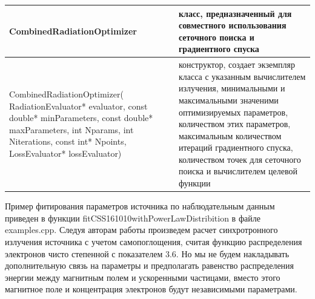 \begin{small}
\begin{xtabular}{|p{0.41\textwidth}|p{0.59\textwidth}|}
		\hline
		\textbf{CombinedRadiationOptimizer} & класс, предназначенный для совместного использования сеточного поиска и градиентного спуска\\
		\hline
		CombinedRadiationOptimizer( RadiationEvaluator* evaluator, const double* minParameters, const double* maxParameters, int Nparams, int Niterations, const int* Npoints, LossEvaluator* lossEvaluator) & конструктор, создает экземпляр класса с указанным вычислителем излучения, минимальными и максимальными значеними оптимизируемых параметров, количеством этих параметров,  максимальным количеством итераций градиентного спуска, количеством точек для сеточного поиска и вычислителем целевой функции\\
		\hline
	\end{xtabular}
\end{small}

Пример фитирования параметров источника по наблюдательным данным приведен в функции fitCSS161010withPowerLawDistribition в файле examples.cpp. Следуя авторам работы \cite{Coppejans2020} произведем расчет синхротронного излучения источника с учетом самопоглощения, считая функцию распределения электронов чисто степенной с показателем 3.6. Но мы не будем накладывать дополнительную связь на параметры и предполагать равенство распределения энергии между магнитным полем и ускоренными частицами, вместо этого магнитное поле и концентрация электронов будут независимыми параметрами.

